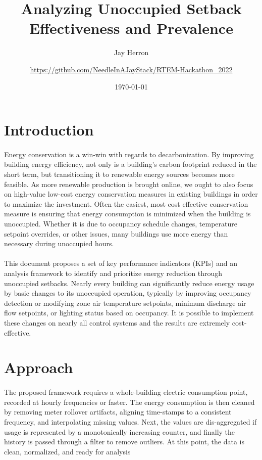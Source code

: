 \documentclass[a4paper]{article}
\begin{document}
\title{Analyzing Unoccupied Setback Effectiveness and Prevalence}
\author{
	Jay Herron
	\and
	\url{https://github.com/NeedleInAJayStack/RTEM-Hackathon\_2022}
}
\date{\today}
\maketitle

\section{Introduction}

\paragraph{}
Energy conservation is a win-win with regards to decarbonization. By improving building energy efficiency, not only is a building's carbon footprint reduced in the short term, but transitioning it to renewable energy sources becomes more feasible. As more renewable production is brought online, we ought to also focus on high-value low-cost energy conservation measures in existing buildings in order to maximize the investment. Often the easiest, most cost effective conservation measure is ensuring that energy consumption is minimized when the building is unoccupied. Whether it is due to occupancy schedule changes, temperature setpoint overrides, or other issues, many buildings use more energy than necessary during unoccupied hours.

\paragraph{}
This document proposes a set of key performance indicators (KPIs) and an analysis framework to identify and prioritize energy reduction through unoccupied setbacks. Nearly every building can significantly reduce energy usage by basic changes to its unoccupied operation, typically by improving occupancy detection or modifying zone air temperature setpoints, minimum discharge air flow setpoints, or lighting status based on occupancy. It is possible to implement these changes on nearly all control systems and the results are extremely cost-effective.

\section{Approach}

\paragraph{}
The proposed framework requires a whole-building electric consumption point, recorded at hourly frequencies or faster. The energy consumption is then cleaned by removing meter rollover artifacts, aligning time-stamps to a consistent frequency, and interpolating missing values. Next, the values are dis-aggregated if usage is represented by a monotonically increasing counter, and finally the history is passed through a filter to remove outliers. At this point, the data is clean, normalized, and ready for analysis
\end{document}
